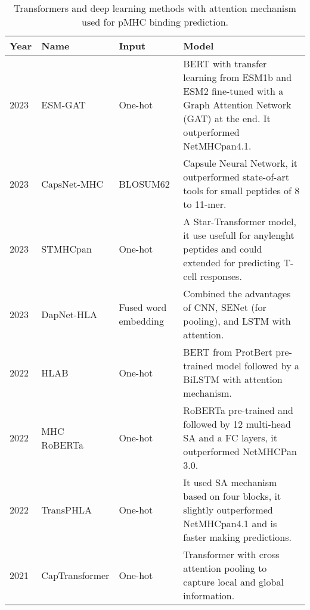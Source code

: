 \begin{table}[h]
	\caption{Transformers and deep learning methods with attention mechanism used for pMHC binding prediction.}
	\label{tab:transformes}
	\setlength{\tabcolsep}{0.5em} %
	{\renewcommand{\arraystretch}{1.1}%
		\scriptsize
		\begin{tabular}{p{1.3cm}p{2.2cm}p{2cm}p{9.5cm}}
			\multicolumn{1}{l}{\textbf{Year}}                                   & \textbf{Name}             & \textbf{Input}            & \textbf{Model}     \\  \hline
			
			2023\cite{hashemi2023improved}&	ESM-GAT  &	One-hot & BERT with transfer learning from ESM1b and ESM2 fine-tuned with a Graph Attention Network (GAT) at the end. It outperformed NetMHCpan4.1.	\\
			
			
			2023\cite{kalemati2023capsnet}&	CapsNet-MHC&	BLOSUM62 & Capsule Neural Network, it outperformed state-of-art tools for small peptides of 8 to 11-mer.	\\
			
			2023\cite{ye2023stmhcpan}&	STMHCpan  &	One-hot & A Star-Transformer model, it use usefull for anylenght peptides and could extended for predicting T-cell responses.	\\
			
			2023\cite{jing2023dapnet}&	DapNet-HLA&	Fused word embedding & Combined the advantages of CNN, SENet (for pooling), and LSTM with attention.	\\
			
			2022\cite{zhang2022hlab}&	HLAB&	One-hot & BERT from ProtBert pre-trained model followed by a BiLSTM with attention mechanism.	\\
			
			2022\cite{wang2022mhcroberta}          & MHC RoBERTa            & One-hot &  RoBERTa  pre-trained and followed by 12 multi-head SA and a FC layers, it outperformed NetMHCPan 3.0.                                                                                          \\
			2022\cite{chu2022transformer}          & TransPHLA             & One-hot         & It used SA mechanism based on four blocks, it slightly outperformed NetMHCpan4.1 and is faster making predictions.\\
			
			2021\cite{chen2021jointly}  & CapTransformer            & One-hot   &  Transformer with cross attention pooling to capture local and global information.  \\
			

\end{tabular}}
\end{table}

